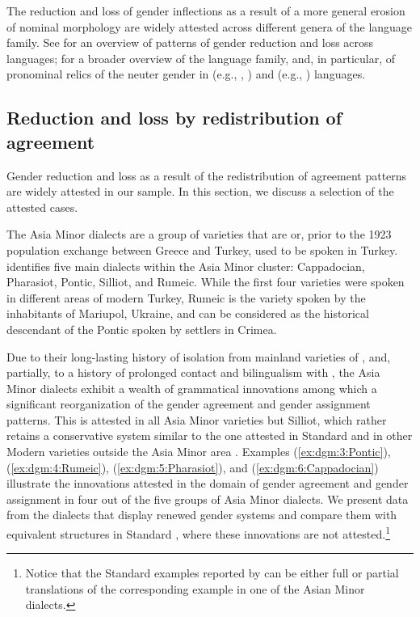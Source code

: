 \documentclass[output=collectionpaper]{langsci/langscibook}
\begin{document}
The reduction and loss of gender inflections as a result of a more general erosion of nominal morphology are widely attested across different genera of the  language family. See \citet[chapter 9]{Audring2009} for an overview of patterns of gender reduction and loss across  languages; \citet{Priestly1983} for a broader overview of the  language family, and, in particular, of pronominal relics of the neuter gender in  (e.g., , ) and  (e.g., ) languages.

\subsection{Reduction and loss by redistribution of agreement}
\label{subsubsec:semanticization}
Gender reduction and loss as a result of the redistribution of agreement patterns are widely attested in our sample. In this section, we discuss a selection of the attested cases.



The Asia Minor  dialects are a group of  varieties that are or, prior to the 1923 population exchange between Greece and Turkey, used to be spoken in Turkey. \citet{Karatsareas2014} identifies five main dialects within the Asia Minor  cluster:  Cappadocian, Pharasiot, Pontic, Silliot, and Rumeic. While the first four varieties were spoken in different areas of modern Turkey, Rumeic is the variety spoken by the  inhabitants of Mariupol, Ukraine, and can be considered as the historical descendant of the Pontic spoken by  settlers in Crimea.

Due to their long-lasting history of isolation from mainland varieties of , and, partially, to a history of prolonged contact and bilingualism with , the Asia Minor  dialects exhibit a wealth of grammatical innovations among which a significant reorganization of the gender agreement and gender assignment patterns. This is attested in all Asia Minor  varieties but Silliot, which rather retains a conservative system similar to the one attested in Standard  and in other Modern  varieties outside the Asia Minor area \citep[83]{Karatsareas2014}. Examples (\ref{ex:dgm:3:Pontic}), (\ref{ex:dgm:4:Rumeic}), (\ref{ex:dgm:5:Pharasiot}), and (\ref{ex:dgm:6:Cappadocian}) illustrate the innovations attested in the domain of gender agreement and gender assignment in four out of the five groups of Asia Minor  dialects. We present data from the dialects that display renewed gender systems and compare them with equivalent structures in Standard , where these innovations are not attested.\footnote{Notice that the Standard  examples reported by \citet{Karatsareas2014} can be either full or partial translations of the corresponding example in one of the Asian Minor  dialects.}
\end{document}
